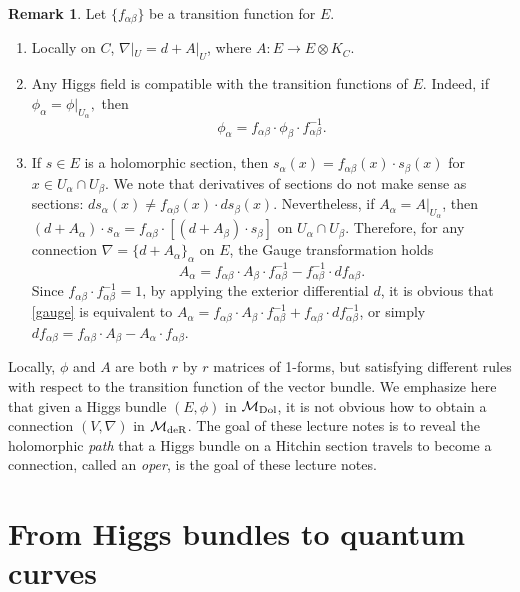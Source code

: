 \documentclass[oneside, 11pt]{amsart}
\theoremstyle{definition}
\newtheorem{rem}[thm]{Remark}
\numberwithin{equation}{subsection}
\def\a{\alpha}
\def\b{\beta}
\def\Dol{{\text{\rm{Dol}}}}
\def\deR{{\text{\rm{deR}}}}
\newcommand{\be}{\begin{equation}}
\newcommand{\ee}{\end{equation}}
\begin{document}
\begin{rem}\label{conditions}
Let $\{f_{\a\b}\}$ be a transition function for $E$. 
\begin{enumerate}
\item Locally on $C$, $\nabla|_{U}=d+ A|_{U}$, where $A:E\stackrel{}{\rightarrow}E\otimes K_C.$

\item Any Higgs field is compatible with the transition functions of $E$. Indeed, if $\phi_{\a}=\phi|_{U_{\a}},$
then 
\be \label{bundle} 
\phi_{\a}=f_{\a\b}\cdot \phi_{\b} \cdot f_{\a\b}^{-1}.
\ee
\item If $s\in E$ is a holomorphic section, then $s_{\a}(x)=f_{\a\b}(x) \cdot s_{\b}(x)$ for $x\in U_{\a}\cap U_{\b}$. We note that derivatives of sections
do not make sense as sections: 
$ds_{\a}(x)\neq f_{\a\b}(x) \cdot ds_{\b}(x)$. Nevertheless, if
$A_{\alpha}=A|_{U_{\alpha}}$, then $(d+A_{\alpha})\cdot s_{\alpha}=f_{\a\b} \cdot [(d+A_{\b})\cdot s_{\b}]$ on $U_{\a}\cap U_{\b}$. Therefore, for any connection $\nabla=\{d+A_{\a}\}_{\a}$ on $E$, the Gauge transformation holds
\be \label{gauge}
A_{\a}=f_{\a\b} \cdot A_{\b}\cdot f_{\a\b}^{-1}-f_{\a\b}^{-1}\cdot df_{\a\b}.
\ee
Since $f_{\a\b}\cdot f_{\a\b}^{-1}=1$, by applying the exterior differential $d$, it is obvious that \eqref{gauge} is equivalent to $A_{\a}=f_{\a\b} \cdot A_{\b}\cdot f_{\a\b}^{-1}+f_{\a\b}\cdot df_{\a\b}^{-1}$, or simply $df_{\a\b}=f_{\a\b}\cdot A_{\b}-A_{\a} \cdot f_{\a\b}$.

\end{enumerate}
\end{rem} 

Locally, $\phi$ and $A$ are both $r$ by $r$ matrices of 1-forms, but satisfying different rules with respect to the transition function of the vector bundle. We emphasize here that given a Higgs bundle $(E, \phi)$ in $\mathcal{M}_{\Dol}$, it is not obvious how to obtain a connection $(V, \nabla)$ in $\mathcal{M}_{\deR}$. The goal of these lecture notes is to reveal the holomorphic \textit{path} that a Higgs bundle on a Hitchin section 
travels to become a connection, called an \textit{oper}, is the goal of these lecture notes.






\section{From Higgs bundles to quantum curves}\label{section 4}
\end{document}
